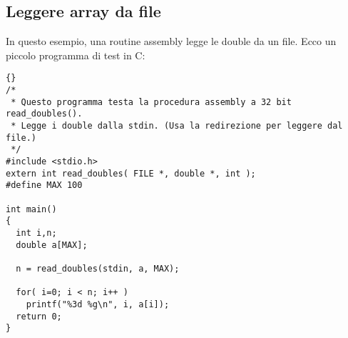 \subsection{Leggere array da file}

In questo esempio, una routine assembly legge le double da un file. Ecco
un piccolo programma di test in C:
\begin{lstlisting}{}
/*
 * Questo programma testa la procedura assembly a 32 bit read_doubles().
 * Legge i double dalla stdin. (Usa la redirezione per leggere dal file.)
 */
#include <stdio.h>
extern int read_doubles( FILE *, double *, int );
#define MAX 100

int main()
{
  int i,n;
  double a[MAX];

  n = read_doubles(stdin, a, MAX);

  for( i=0; i < n; i++ )
    printf("%3d %g\n", i, a[i]);
  return 0;
}
\end{lstlisting}

